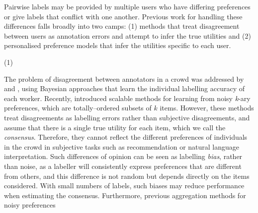 Pairwise labels may be provided by multiple users who have differing preferences or give labels 
that conflict with one another. 
Previous work for handling these differences falls broadly into two camps: (1)
methods that treat disagreement between users as annotation errors and attempt to infer the true utilities
and (2) personalised preference models that infer the utilities specific to each user.

(1)

The problem of disagreement between annotators in a crowd was addressed by \citet{chen2013pairwise}
and \citet{wang2016blind},
using Bayesian approaches that learn the individual labelling accuracy of each worker.
Recently, \citet{pan2018stagewise,han2018robust}
introduced scalable methods for learning from noisy \textit{k}-ary preferences,
which are totally--ordered subsets of $k$ items.
However, these methods treat disagreements as labelling errors 
rather than subjective disagreements, and assume that there is a single true utility for each item,
which we call the \emph{consensus}.
Therefore, they cannot reflect the different preferences of individuals in the crowd in subjective tasks
such as recommendation or natural language interpretation.
Such differences of opinion can be seen as labelling \emph{bias}, rather than noise,
as a labeller will consistently express preferences that are different from others,
and this difference is not random but depends directly on the items considered.
With small numbers of labels, such biases may reduce performance when estimating 
the consensus.
Furthermore, previous aggregation methods for noisy preferences
